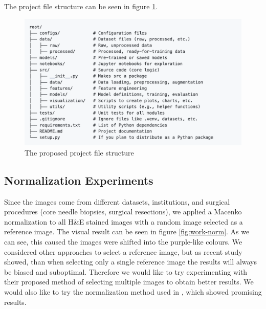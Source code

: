 The project file structure can be seen in figure \ref{fig:project-structure}.

\begin{figure}[H]
    \begin{centering}
    \includegraphics[width=14cm]{assets/images/project-structure.png}
    \par\end{centering}
    \caption{The proposed project file structure}
    \label{fig:project-structure}
\end{figure}

\subsection{Normalization Experiments}
Since the images come from different datasets, institutions, and surgical procedures (core needle biopsies, surgical resections), we applied a Macenko normalization to all H\&E stained images with a random image selected as a reference image. The visual result can be seen in figure \ref{fig:work-norm}. As we can see, this caused the images were shifted into the purple-like colours. We considered other approaches to select a reference image, but as recent study \cite{Ivanov2024} showed, than when selecting only a single reference image the results will always be biased and suboptimal. Therefore we would like to try experimenting with their proposed method of selecting multiple images to obtain better results. We would also like to try the normalization method used in \cite{Vahadane2015}, which showed promising results.

